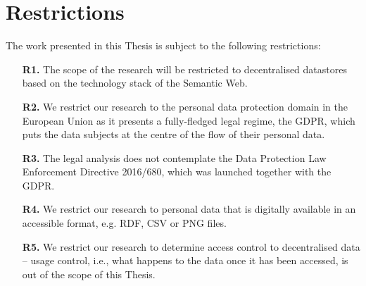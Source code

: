 \section{Restrictions}
\label{sec:restrictions}

The work presented in this Thesis is subject to the following restrictions:

\begin{enumerate}
    \item [\textbf{R1.}] The scope of the research will be restricted to decentralised datastores based on the technology stack of the Semantic Web.
    \item [\textbf{R2.}] We restrict our research to the personal data protection domain in the European Union as it presents a fully-fledged legal regime, the GDPR, which puts the data subjects at the centre of the flow of their personal data.
    \item [\textbf{R3.}] The legal analysis does not contemplate the Data Protection Law Enforcement Directive 2016/680, which was launched together with the GDPR.
    \item [\textbf{R4.}] We restrict our research to personal data that is digitally available in an accessible format, e.g. RDF, CSV or PNG files.
    \item [\textbf{R5.}] We restrict our research to determine access control to decentralised data -- usage control, i.e., what happens to the data once it has been accessed, is out of the scope of this Thesis.
\end{enumerate}